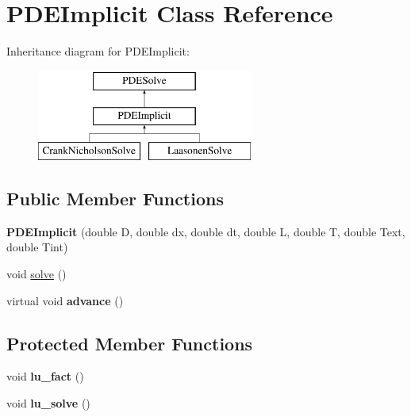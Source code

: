 \hypertarget{class_p_d_e_implicit}{}\section{P\+D\+E\+Implicit Class Reference}
\label{class_p_d_e_implicit}
Inheritance diagram for P\+D\+E\+Implicit\+:\begin{figure}[H]
\begin{center}
\leavevmode
\includegraphics[height=3.000000cm]{class_p_d_e_implicit}
\end{center}
\end{figure}
\subsection*{Public Member Functions}
\begin{DoxyCompactItemize}
\item 
\mbox{\label{class_p_d_e_implicit_a95e1d8572ae2356554f25633391f02f2}} 
{\bfseries P\+D\+E\+Implicit} (double D, double dx, double dt, double L, double T, double Text, double Tint)
\item 
void \hyperlink{class_p_d_e_implicit_ace06b1a56c2766ca8d4bc95669d21d12}{solve} ()
\item 
\mbox{\label{class_p_d_e_implicit_a60980fe1e316329ab95ad179fce5a88b}} 
virtual void {\bfseries advance} ()
\end{DoxyCompactItemize}
\subsection*{Protected Member Functions}
\begin{DoxyCompactItemize}
\item 
\mbox{\label{class_p_d_e_implicit_afa24d3aa2a58330c693c351f917fdaa7}} 
void {\bfseries lu\+\_\+fact} ()
\item 
\mbox{\label{class_p_d_e_implicit_af27dc1837e1e1b6f2e930f35441402de}} 
void {\bfseries lu\+\_\+solve} ()
\end{DoxyCompactItemize}
